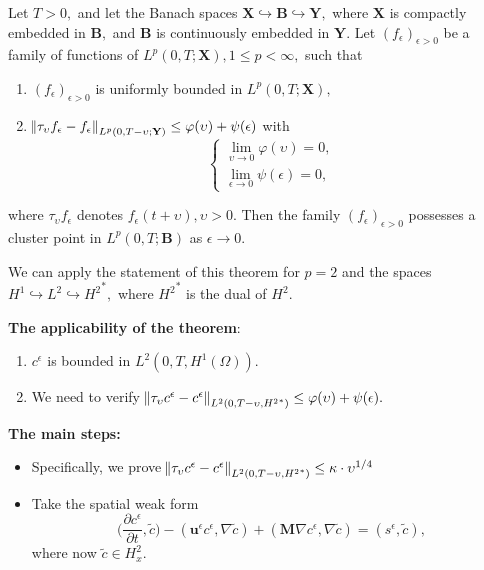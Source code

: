 \documentclass{beamer}
\begin{document}
\begin{frame}
\vspace{-0.6cm}
\begin{theorem}
Let $T>0,$ and let the Banach spaces $\mathbf{X} \hookrightarrow \mathbf{B} \hookrightarrow \mathbf{Y},$ where $\mathbf{X}$ is compactly embedded in $\mathbf{B},$ and $\mathbf{B}$ is continuously embedded in $\mathbf{Y}.$ Let $(f_\epsilon)_{\epsilon>0}$ be a family of functions of $L^p (0,T; \mathbf{X}), 1 \leq p < \infty,$ such that
\begin{enumerate}
  \item $(f_\epsilon)_{\epsilon>0}$ is uniformly bounded in $L^p (0,T; \mathbf{X}),$
  \item $\norm{\tau_\upsilon f_\epsilon - f_\epsilon}_{L^p(0,T-\upsilon; \mathbf{Y})} \leq \varphi(\upsilon) + \psi(\epsilon)$ with
  $$
    \begin{cases}
      \lim_{\upsilon \to 0} \varphi(\upsilon) = 0,\\
      \lim_{\epsilon \to 0} \psi(\epsilon) = 0,
    \end{cases}
  $$
  \end{enumerate}
  
where $\tau_\upsilon f_\epsilon$ denotes $f_\epsilon (t+\upsilon), \upsilon > 0.$ Then the family $(f_\epsilon)_{\epsilon>0}$ possesses a cluster point in $L^p (0,T; \mathbf{B})$ as $\epsilon \to 0.$
\end{theorem}
\end{frame}

\begin{frame}

We can apply the statement of this theorem for $p=2$ and the spaces $H^1 \hookrightarrow L^2 \hookrightarrow {H^2}^*,$ where ${H^2}^*$ is the dual of ${H^2}$.

\textbf{The applicability of the theorem}:
\begin{enumerate}
  \item $c^\epsilon$ is bounded in $L^2(0,T, H^1(\Omega)).$
  \item We need to verify $\norm{\tau_\upsilon c^\epsilon - c^\epsilon}_{L^2(0,T-\upsilon, {H^2}^*)} \leq \varphi(\upsilon) + \psi(\epsilon).$
\end{enumerate}

\textbf{The main steps:}

\begin{itemize}
  \item Specifically, we prove $\norm{\tau_\upsilon c^\epsilon - c^\epsilon}_{L^2(0,T-\upsilon, {H^2}^*)} \leq \kappa \cdot \upsilon^{1/4}$
  \item Take the spatial weak form \begin{equation} \nonumber \bigg (\frac{\partial c^\epsilon}{\partial t}, \tilde{c} \bigg ) - (\mathbf{u}^\epsilon c^\epsilon, \nabla \tilde{c}) + (\mathbf{M} \nabla c^\epsilon, \nabla \tilde{c}) = (s^\epsilon, \tilde{c}), \end{equation} where now $\tilde{c} \in H^2_x.$
\end{itemize}

\end{frame}
\end{document}
